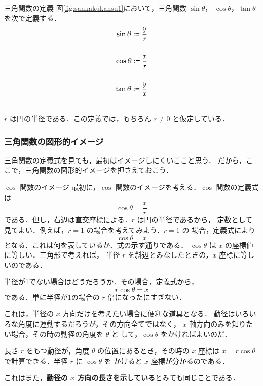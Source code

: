         \begin{itembox}[l]{三角関数の定義}
            図\ref{fig:sankakukansu1}において，三角関数 $\sin\theta$，
            $\cos\theta$，$\tan\theta$ を次で定義する．
                \begin{align}
                    \sin\theta := \frac{y}{r}\\ \notag \\
                    \cos\theta := \frac{x}{r}\\ \notag \\
                    \tan\theta := \frac{y}{x}
                \end{align}
        \end{itembox}\\
    $r$ は円の半径である．この定義では，もちろん $r  \neq  0$ と仮定している．

\subsubsection{三角関数の図形的イメージ}
    三角関数の定義式を見ても，最初はイメージしにくいここと思う．
    だから，ここで，三角関数の図形的イメージを押さえておこう．

    \begin{mysmallsec}{$\cos$ 関数のイメージ}
        最初に，$\cos$ 関数のイメージを考える．$\cos$ 関数の定義式は
            \begin{equation*}
                \cos \theta = \frac{x}{r}
            \end{equation*}
        である．但し，右辺は直交座標による．$r$ は円の半径であるから，
        定数として見てよい．例えば，$r=1$ の場合を考えてみよう．$r=1$ の
        場合，定義式により
            \begin{equation*}
                \cos \theta = x
            \end{equation*}
        となる．これは何を表しているか．式の示す通りである．
        $\cos \theta$ は $x$ の座標値に等しい．三角形で考えれば，
        半径 $r$ を斜辺とみなしたときの，$x$ 座標に等しいのである．


        半径が1でない場合はどうだろうか．その場合，定義式から，
            \begin{equation*}
                r \cos \theta = x
            \end{equation*}
        である．単に半径が1の場合の $r$ 倍になったにすぎない．


        これは，半径の $x$ 方向だけを考えたい場合に便利な道具となる．
        動径はいろいろな角度に運動するだろうが，その方向全てではなく，
        $x$ 軸方向のみを知りたい場合，その時の動径の角度を $\theta$ と
        して，$\cos \theta$ をかければよいのだ．


        長さ $r$ をもつ動径が，角度 $\theta$ の位置にあるとき，その時の
        $x$ 座標は $x = r \cos \theta$ で計算できる．半径 $r$ に $\cos \theta$ を
        かけると $x$ 座標が分かるのである．

        これはまた，\textbf{動径の $x$ 方向の長さを示している}とみても同じことである．
    \end{mysmallsec}


